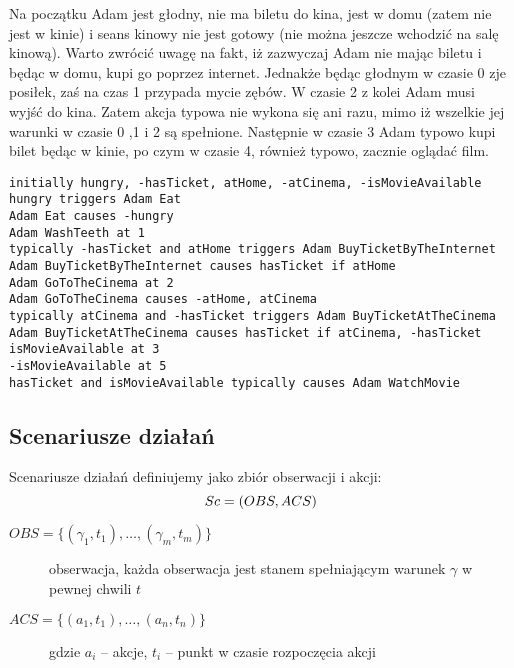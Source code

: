 \begin{example}\label{przyk:syntaktyka_jezyka_akcji}
Na początku Adam jest głodny, nie ma biletu do kina, jest w domu (zatem nie jest w kinie)
i seans kinowy nie jest gotowy (nie można jeszcze wchodzić na salę kinową).
Warto zwrócić uwagę na fakt, iż zazwyczaj Adam nie mając biletu i będąc w domu, kupi go poprzez internet.
Jednakże będąc głodnym w czasie 0 zje posiłek, zaś na czas 1 przypada mycie zębów. W czasie 2 z kolei
Adam musi wyjść do kina. Zatem akcja typowa nie wykona się ani razu, mimo iż wszelkie jej warunki w czasie 0 ,1 i 2
są spełnione. Następnie w czasie 3 Adam typowo kupi bilet będąc w kinie, po czym w czasie 4, również typowo,
zacznie oglądać film.

	\begin{lstlisting}
initially hungry, -hasTicket, atHome, -atCinema, -isMovieAvailable
hungry triggers Adam Eat
Adam Eat causes -hungry
Adam WashTeeth at 1
typically -hasTicket and atHome triggers Adam BuyTicketByTheInternet
Adam BuyTicketByTheInternet causes hasTicket if atHome
Adam GoToTheCinema at 2
Adam GoToTheCinema causes -atHome, atCinema
typically atCinema and -hasTicket triggers Adam BuyTicketAtTheCinema
Adam BuyTicketAtTheCinema causes hasTicket if atCinema, -hasTicket
isMovieAvailable at 3
-isMovieAvailable at 5
hasTicket and isMovieAvailable typically causes Adam WatchMovie
	\end{lstlisting}
\end{example}


\subsection{Scenariusze działań}
\begin{definition}
Scenariusze działań definiujemy jako zbiór obserwacji i akcji:
\begin{equation}
	Sc = (OBS, ACS)\\
\end{equation}
\begin{description}
	\item[$OBS = \lbrace(\gamma_1, t_1), \dots, (\gamma_m, t_m)\rbrace$]
	obserwacja, każda obserwacja jest stanem spełniającym warunek $\gamma$ w pewnej chwili $t$
	\item[$ACS = \lbrace(a_1, t_1), \dots, (a_n, t_n) \rbrace$]
	gdzie $a_i$ -- akcje, $t_i$ -- punkt w czasie rozpoczęcia akcji
\end{description}
\end{definition}

